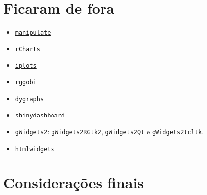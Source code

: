 \section{Ficaram de fora}

\begin{frame}

  \begin{itemize}
  \item 
    \href{https://cran.r-project.org/web/packages/manipulate/index.html}{\texttt{manipulate}}
  \item 
    \href{http://ramnathv.github.io/rCharts/}{\texttt{rCharts}}
  \item
    \href{http://cran.r-project.org/web/packages/iplots/index.html}{\texttt{iplots}}
  \item
    \href{http://cran.r-project.org/web/packages/rggobi/index.html}{\texttt{rggobi}}
  \item
    \href{https://rstudio.github.io/dygraphs/index.html}{\texttt{dygraphs}}
  \item
    \href{http://rstudio.github.io/shinydashboard/index.html}{\texttt{shinydashboard}}
  \item
    \href{https://cran.r-project.org/web/packages/gWidgets2/index.html}{\texttt{gWidgets2}}:
    \texttt{gWidgets2RGtk2}, \texttt{gWidgets2Qt} e \texttt{gWidgets2tcltk}.
  \item
    \href{http://www.htmlwidgets.org/index.html}{\texttt{htmlwidgets}}
  \end{itemize}

\end{frame}

\section{Considerações finais}

